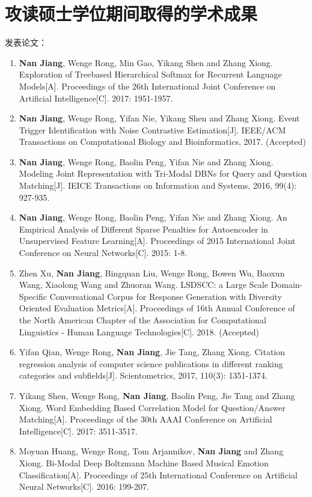 \chapter{攻读硕士学位期间取得的学术成果}
\noindent 发表论文：
\begin{enumerate}[label=\arabic*.]
\item \textbf{Nan Jiang}, Wenge Rong, Min Gao, Yikang Shen and Zhang Xiong. Exploration of Treebased Hierarchical Softmax for Recurrent Language Models[A]. Proceedings of the 26th International Joint Conference on Artificial Intelligence[C]. 2017: 1951-1957.
\item \textbf{Nan Jiang}, Wenge Rong, Yifan Nie, Yikang Shen and Zhang Xiong. Event Trigger Identification with Noise Contrastive Estimation[J]. IEEE/ACM Transactions on Computational Biology and Bioinformatics, 2017. (Accepted)
\item \textbf{Nan Jiang}, Wenge Rong, Baolin Peng, Yifan Nie and Zhang Xiong. Modeling Joint Representation with Tri-Modal DBNs for Query and Question Matching[J]. IEICE Transactions on Information and Systems, 2016, 99(4): 927-935.
\item \textbf{Nan Jiang}, Wenge Rong, Baolin Peng, Yifan Nie and Zhang Xiong. An Empirical Analysis of Different Sparse Penalties for Autoencoder in Unsupervised Feature Learning[A]. Proceedings of 2015 International Joint Conference on Neural Networks[C]. 2015: 1-8.
\item Zhen Xu, \textbf{Nan Jiang}, Bingquan Liu, Wenge Rong, Bowen Wu, Baoxun Wang, Xiaolong Wang and Zhuoran Wang. LSDSCC: a Large Scale Domain-Specific Conversational Corpus for Response Generation with Diversity Oriented Evaluation Metrics[A]. Proceedings of 16th Annual Conference of the North American Chapter of the Association for Computational Linguistics - Human Language Technologies[C]. 2018. (Accepted)
\item Yifan Qian, Wenge Rong, \textbf{Nan Jiang}, Jie Tang, Zhang Xiong. Citation regression analysis of computer science publications in different ranking categories and subfields[J]. Scientometrics, 2017, 110(3): 1351-1374.
\item Yikang Shen, Wenge Rong, \textbf{Nan Jiang}, Baolin Peng, Jie Tang and Zhang Xiong. Word Embedding Based Correlation Model for Question/Answer Matching[A]. Proceedings of the 30th AAAI Conference on Artificial Intelligence[C]. 2017: 3511-3517.
\item Moyuan Huang, Wenge Rong, Tom Arjannikov, \textbf{Nan Jiang} and Zhang Xiong. Bi-Modal Deep Boltzmann Machine Based Musical Emotion Classification[A]. Proceedings of 25th International Conference on Artificial Neural Networks[C]. 2016: 199-207.
\end{enumerate}
